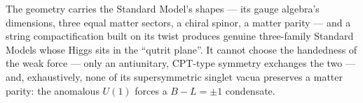 \begin{keyidea}
The geometry carries the Standard Model's shapes --- its gauge algebra's dimensions, three
equal matter sectors, a chiral spinor, a matter parity --- and a string compactification
built on its twist produces genuine three-family Standard Models whose Higgs sits in the
``qutrit plane''. It cannot choose the handedness of the weak force --- only an antiunitary,
CPT-type symmetry exchanges the two --- and, exhaustively, none of its supersymmetric singlet
vacua preserves a matter parity: the anomalous $U(1)$ forces a $B-L=\pm1$ condensate.
\end{keyidea}
